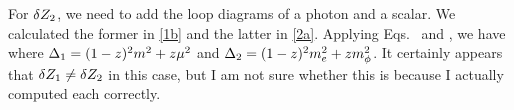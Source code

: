 {	For $\delta Z_2$, we need to add the loop diagrams of a photon and a scalar.  We calculated the former in \ref{1b} and the latter in \ref{2a}.  Applying Eqs.~ and , we have
	where $\Delta_1 = (1 - z)^2 m^2 + z \mu^2$ and $\Delta_2 = (1 - z)^2 m_e^2 + z m_\phi^2$.  It certainly appears that $\delta Z_1 \neq \delta Z_2$ in this case, but I am not sure whether this is because I actually computed each correctly.
}